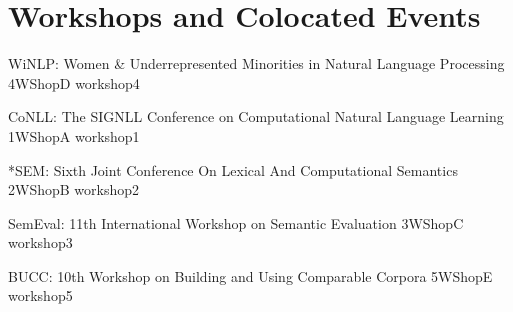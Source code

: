 \chapter[Workshops and Colocated Events: \daydate]{Workshops and Colocated Events}
\thispagestyle{emptyheader}
\vfill





\begin{wsschedule}
  {WiNLP: Women \& Underrepresented Minorities in Natural Language Processing}
  {4}{WShopD}
  {workshop4}
  {\WShopLocD}
  
\end{wsschedule}


\begin{wsschedule}
  {CoNLL: The SIGNLL Conference on Computational Natural Language Learning}
  {1}{WShopA}
  {workshop1}
  {\WShopLocA}
  
\end{wsschedule}

\begin{wsschedule}
  {*SEM: Sixth Joint Conference On Lexical And Computational Semantics}
  {2}{WShopB}
  {workshop2}
  {\WShopLocB}
  
\end{wsschedule}

\begin{wsschedule}
  {SemEval: 11th International Workshop on Semantic Evaluation}
  {3}{WShopC}
  {workshop3}
  {\WShopLocC}
  
\end{wsschedule}


\begin{wsschedule}
  {BUCC: 10th Workshop on Building and Using Comparable Corpora}
  {5}{WShopE}
  {workshop5}
  {\WShopLocE}
  
\end{wsschedule}

